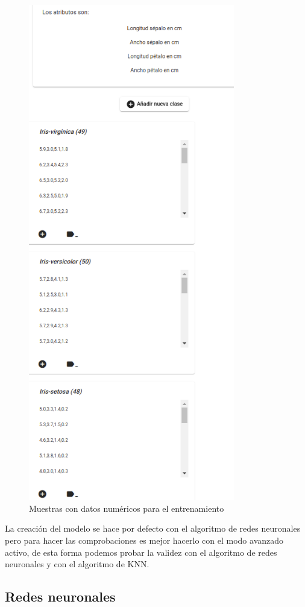 \documentclass[a4paper, 12pt]{book}
\begin{document}
\begin{figure}
	\centering
	\includegraphics[width=9cm, keepaspectratio]{img/ejemplo_muestras_num.png}
	\caption{Muestras con datos numéricos para el entrenamiento} 	\label{fig:ejemplo3}
\end{figure}

La creación del modelo se hace por defecto con el algoritmo de redes neuronales pero para hacer las comprobaciones es mejor hacerlo con el modo avanzado activo, de esta forma podemos probar la validez con el algoritmo de redes neuronales y con el algoritmo de KNN.

\subsection{Redes neuronales}
\label{subsec:redesneuronales}
\end{document}
